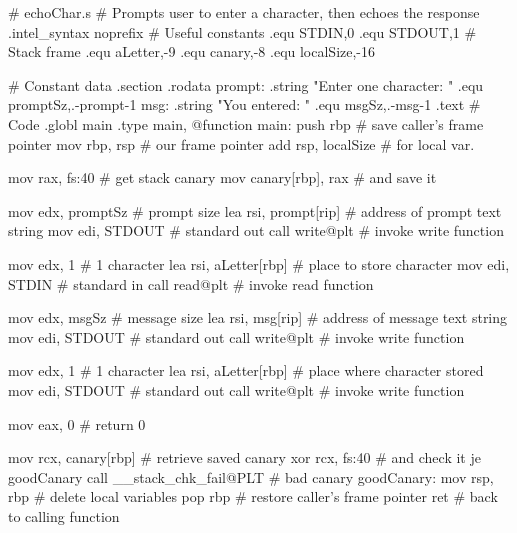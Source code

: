 \begin{ffcode}
# echoChar.s
# Prompts user to enter a character, then echoes the response
        .intel_syntax noprefix
# Useful constants
        .equ    STDIN,0
        .equ    STDOUT,1
# Stack frame
        .equ    aLetter,-9
        .equ    canary,-8
        .equ    localSize,-16

# Constant data
        .section  .rodata
prompt:
        .string "Enter one character: "
        .equ    promptSz,.-prompt-1
msg:
        .string "You entered: "
        .equ    msgSz,.-msg-1
        .text
# Code 
        .globl  main
        .type   main, @function
main:
        push    rbp                   # save caller's frame pointer
        mov     rbp, rsp              # our frame pointer
        add     rsp, localSize        # for local var.

        mov     rax, fs:40            # get stack canary
        mov     canary[rbp], rax      # and save it

        mov     edx, promptSz         # prompt size
        lea     rsi, prompt[rip]      # address of prompt text string
        mov     edi, STDOUT           # standard out
        call    write@plt             # invoke write function

        mov     edx, 1                # 1 character
        lea     rsi, aLetter[rbp]     # place to store character
        mov     edi, STDIN            # standard in
        call    read@plt              # invoke read function

        mov     edx, msgSz            # message size
        lea     rsi, msg[rip]         # address of message text string
        mov     edi, STDOUT           # standard out
        call    write@plt             # invoke write function

        mov     edx, 1                # 1 character
        lea     rsi, aLetter[rbp]     # place where character stored
        mov     edi, STDOUT           # standard out
        call    write@plt             # invoke write function

        mov     eax, 0                # return 0

        mov     rcx, canary[rbp]      # retrieve saved canary
        xor     rcx, fs:40            # and check it
        je      goodCanary
        call    __stack_chk_fail@PLT  # bad canary
goodCanary:
        mov     rsp, rbp              # delete local variables
        pop     rbp                   # restore caller's frame pointer
        ret                           # back to calling function
\end{ffcode}

